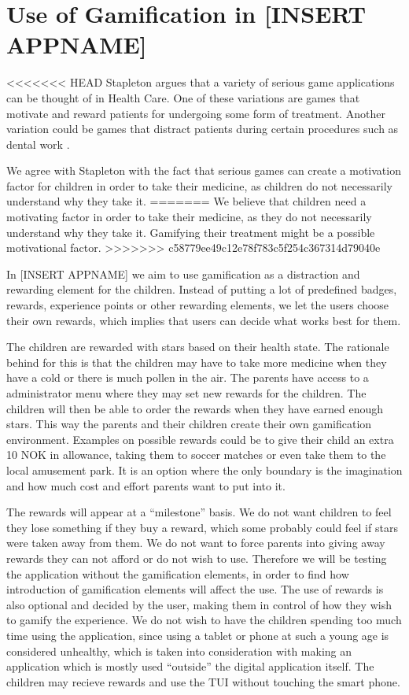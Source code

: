 \section{Use of Gamification in [INSERT APPNAME]}
\label{gamificationinapp}

<<<<<<< HEAD
Stapleton argues that a variety of serious game applications can be thought of in Health Care. One of these variations are games that motivate and reward patients for undergoing some form of treatment. Another variation could be games that distract patients during certain procedures such as dental work \cite{stapleton2004serious}.     

We agree with Stapleton with the fact that serious games can create a motivation factor for children in order to take their medicine, as children do not necessarily understand why they take it.   
=======
We believe that children need a motivating factor in order to take their medicine, as they do not necessarily understand why they take it. Gamifying their treatment might be a possible motivational factor.  
>>>>>>> c58779ee49c12e78f783c5f254c367314d79040e


In [INSERT APPNAME] we aim to use gamification as a distraction and rewarding element for the children. Instead of putting a lot of predefined badges, rewards, experience points or other rewarding elements, we let the users choose their own rewards, which implies that users can decide what works best for them.  
 

The children are rewarded with stars based on their health state. The rationale behind for this is that the children may have to take more medicine when they have a cold or there is much pollen in the air. The parents have access to a administrator menu where they may set new rewards for the children. The children will then be able to order the rewards when they have earned enough stars. This way the parents and their children create their own gamification environment. Examples on possible rewards could be to give their child an extra 10 NOK in allowance, taking them to soccer matches or even take them to the local amusement park. It is an option where the only boundary is the imagination and how much cost and effort parents want to put into it.    


The rewards will appear at a ``milestone'' basis. We do not want children to feel they lose something if they buy a reward, which some probably could feel if stars were taken away from them. We do not want to force parents into giving away rewards they can not afford or do not wish to use. Therefore we will be testing the application without the gamification elements, in order to find how introduction of gamification elements will affect the use. The use of rewards is also optional and decided by the user, making them in control of how they wish to gamify the experience. 
We do not wish to have the children spending too much time using the application, since using a tablet or phone at such a young age is considered unhealthy, which is taken into consideration with making an application which is mostly used ``outside'' the digital application itself. The children may recieve rewards and use the TUI without touching the smart phone.

